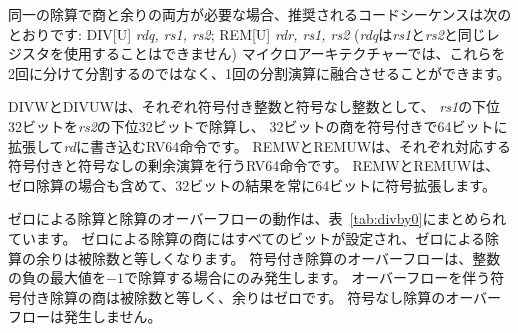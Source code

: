 同一の除算で商と余りの両方が必要な場合、推奨されるコードシーケンスは次のとおりです: 
DIV[U] {\em rdq, rs1, rs2}; REM[U] {\em rdr, rs1, rs2}
({\em rdq}は{\em rs1}と{\em rs2}と同じレジスタを使用することはできません)
マイクロアーキテクチャーでは、これらを2回に分けて分割するのではなく、1回の分割演算に融合させることができます。

\begin{comment}
DIVW and DIVUW are RV64 instructions that divide the
lower 32 bits of {\em rs1} by the lower 32 bits of {\em rs2}, treating
them as signed and unsigned integers respectively, placing the 32-bit
quotient in {\em rd}, sign-extended to 64 bits.  REMW and REMUW
are RV64 instructions that provide the corresponding
signed and unsigned remainder operations respectively. Both REMW and
REMUW always sign-extend the 32-bit result to 64 bits, including on a
divide by zero.
\end{comment}

DIVWとDIVUWは、それぞれ符号付き整数と符号なし整数として、
{\em rs1}の下位32ビットを{\em rs2}の下位32ビットで除算し、
32ビットの商を符号付きで64ビットに拡張して{\em rd}に書き込むRV64命令です。
REMWとREMUWは、それぞれ対応する符号付きと符号なしの剰余演算を行うRV64命令です。
REMWとREMUWは、ゼロ除算の場合も含めて、32ビットの結果を常に64ビットに符号拡張します。

\begin{comment}
The semantics for division by zero and division overflow are summarized in
Table~\ref{tab:divby0}.  The quotient of division by zero has all bits set, and
the remainder of division by zero equals the dividend.  Signed division overflow
occurs only when the most-negative integer is divided by $-1$.  The quotient of
a signed division with overflow is equal to the dividend, and the remainder is
zero. Unsigned division overflow cannot occur.
\end{comment}

ゼロによる除算と除算のオーバーフローの動作は、表~\ref{tab:divby0}にまとめられています。
ゼロによる除算の商にはすべてのビットが設定され、ゼロによる除算の余りは被除数と等しくなります。
符号付き除算のオーバーフローは、整数の負の最大値を$-1$で除算する場合にのみ発生します。
オーバーフローを伴う符号付き除算の商は被除数と等しく、余りはゼロです。
符号なし除算のオーバーフローは発生しません。

